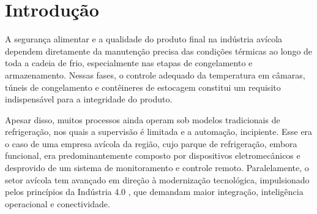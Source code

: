\documentclass[12pt]{article}
\begin{document}
\section{Introdução}

A segurança alimentar e a qualidade do produto final na indústria avícola dependem diretamente da manutenção precisa das condições térmicas ao longo de toda a cadeia de frio, especialmente nas etapas de congelamento e armazenamento. Nessas fases, o controle adequado da temperatura em câmaras, túneis de congelamento e contêineres de estocagem constitui um requisito indispensável para a integridade do produto. 

Apesar disso, muitos processos ainda operam sob modelos tradicionais de refrigeração, nos quais a supervisão é limitada e a automação, incipiente. Esse era o caso de uma empresa avícola da região, cujo parque de refrigeração, embora funcional, era predominantemente composto por dispositivos eletromecânicos e desprovido de um sistema de monitoramento e controle remoto. Paralelamente, o setor avícola tem avançado em direção à modernização tecnológica, impulsionado pelos princípios da Indústria 4.0 \cite{tecnotri2019}, que demandam maior integração, inteligência operacional e conectividade.

\end{document}
